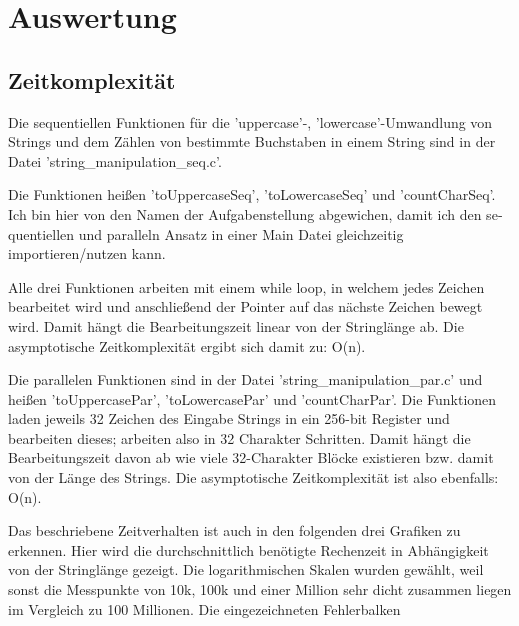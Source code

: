 \documentclass[plainarticle,zihtitle,german,final,hyperref,utf8]{zihpub}
\begin{document}
\section{Auswertung}
\subsection{Zeitkomplexität}
Die se­quen­ti­ellen Funktionen für die 'uppercase'-, 'lowercase'-Umwandlung von Strings und dem Zählen von bestimmte Buchstaben in einem String sind in der Datei 'string\_manipulation\_seq.c'.

Die Funktionen heißen 'toUppercaseSeq', 'toLowercaseSeq' und 'countCharSeq'. Ich bin hier von den Namen der Aufgabenstellung abgewichen, damit ich den se­quen­ti­ellen und paralleln Ansatz in einer Main Datei gleichzeitig importieren/nutzen kann.

Alle drei Funktionen arbeiten mit einem while loop, in welchem jedes Zeichen bearbeitet wird und anschließend der Pointer auf das nächste Zeichen bewegt wird. Damit hängt die Bearbeitungszeit linear von der Stringlänge ab. Die asymptotische Zeitkomplexität ergibt sich damit zu: O(n).
\newline

Die parallelen Funktionen sind in der Datei 'string\_manipulation\_par.c' und heißen 'toUppercasePar', 'toLowercasePar' und 'countCharPar'.
Die Funktionen laden jeweils 32 Zeichen des Eingabe Strings in ein 256-bit Register und bearbeiten dieses; arbeiten also in 32 Charakter Schritten.
Damit hängt die Bearbeitungszeit davon ab wie viele 32-Charakter Blöcke existieren bzw. damit von der Länge des Strings. Die asymptotische Zeitkomplexität ist also ebenfalls: O(n).
\newline

Das beschriebene Zeitverhalten ist auch in den folgenden drei Grafiken zu erkennen.
Hier wird die durchschnittlich benötigte Rechenzeit in Abhängigkeit von der Stringlänge gezeigt.
Die logarithmischen Skalen wurden gewählt, weil sonst die Messpunkte von 10k, 100k und einer Million sehr dicht zusammen liegen im Vergleich zu 100 Millionen.
Die eingezeichneten Fehlerbalken 
\end{document}
